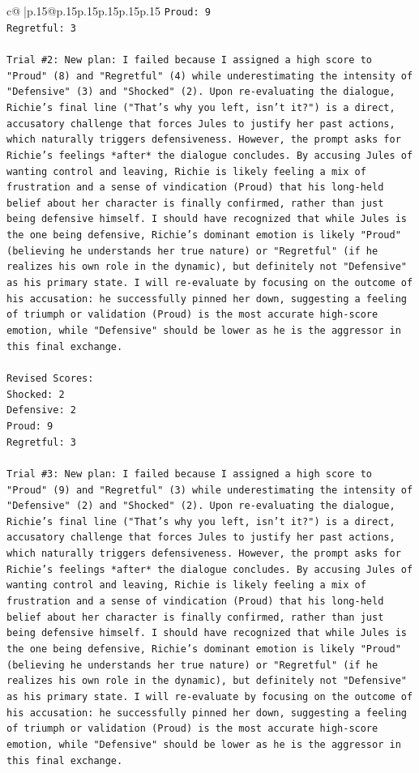 \documentclass{article}
\begin{document}
{\begin{supertabular}{c@{$\;$}|p{.15\linewidth}@{}p{.15\linewidth}p{.15\linewidth}p{.15\linewidth}p{.15\linewidth}p{.15\linewidth}}
{{{\texttt{Proud: 9} \\
\texttt{Regretful: 3} \\
\\ 
\texttt{Trial \#2: New plan: I failed because I assigned a high score to "Proud" (8) and "Regretful" (4) while underestimating the intensity of "Defensive" (3) and "Shocked" (2). Upon re{-}evaluating the dialogue, Richie's final line ("That's why you left, isn't it?") is a direct, accusatory challenge that forces Jules to justify her past actions, which naturally triggers defensiveness. However, the prompt asks for Richie's feelings *after* the dialogue concludes. By accusing Jules of wanting control and leaving, Richie is likely feeling a mix of frustration and a sense of vindication (Proud) that his long{-}held belief about her character is finally confirmed, rather than just being defensive himself. I should have recognized that while Jules is the one being defensive, Richie's dominant emotion is likely "Proud" (believing he understands her true nature) or "Regretful" (if he realizes his own role in the dynamic), but definitely not "Defensive" as his primary state. I will re{-}evaluate by focusing on the outcome of his accusation: he successfully pinned her down, suggesting a feeling of triumph or validation (Proud) is the most accurate high{-}score emotion, while "Defensive" should be lower as he is the aggressor in this final exchange.} \\
\\ 
\texttt{Revised Scores:} \\
\texttt{Shocked: 2} \\
\texttt{Defensive: 2} \\
\texttt{Proud: 9} \\
\texttt{Regretful: 3} \\
\\ 
\texttt{Trial \#3: New plan: I failed because I assigned a high score to "Proud" (9) and "Regretful" (3) while underestimating the intensity of "Defensive" (2) and "Shocked" (2). Upon re{-}evaluating the dialogue, Richie's final line ("That's why you left, isn't it?") is a direct, accusatory challenge that forces Jules to justify her past actions, which naturally triggers defensiveness. However, the prompt asks for Richie's feelings *after* the dialogue concludes. By accusing Jules of wanting control and leaving, Richie is likely feeling a mix of frustration and a sense of vindication (Proud) that his long{-}held belief about her character is finally confirmed, rather than just being defensive himself. I should have recognized that while Jules is the one being defensive, Richie's dominant emotion is likely "Proud" (believing he understands her true nature) or "Regretful" (if he realizes his own role in the dynamic), but definitely not "Defensive" as his primary state. I will re{-}evaluate by focusing on the outcome of his accusation: he successfully pinned her down, suggesting a feeling of triumph or validation (Proud) is the most accurate high{-}score emotion, while "Defensive" should be lower as he is the aggressor in this final exchange.} \\
}}}
\end{supertabular}}
\end{document}
